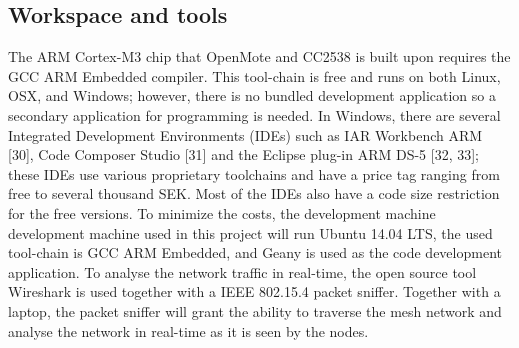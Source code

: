 \subsection{Workspace and tools}

The ARM Cortex-M3 chip that OpenMote and CC2538 is built upon requires the GCC ARM Embedded compiler.
This tool-chain is free and runs on both Linux,
	OSX,
	and Windows;
	however,
	there is no bundled development application so a secondary application for programming is needed.
In Windows,
	there are several Integrated Development Environments (IDEs) such as IAR Workbench ARM [30],
	Code Composer Studio [31] and the Eclipse plug-in ARM DS-5 [32, 33];
	these IDEs use various proprietary toolchains and have a price tag ranging from free to several thousand SEK.
Most of the IDEs also have a code size restriction for the free versions.
To minimize the costs,
	the development machine development machine used in this project will run Ubuntu 14.04 LTS,
	the used tool-chain is GCC ARM Embedded,
	and Geany is used as the code development application.
To analyse the network traffic in real-time,
	the open source tool Wireshark is used together with a IEEE 802.15.4 packet sniffer.
Together with a laptop,
	the packet sniffer will grant the ability to traverse the mesh network and analyse the network in real-time as it is seen by the nodes.


